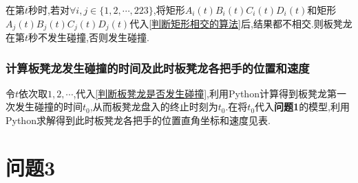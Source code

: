 \documentclass[lang=cn,newtx,10pt,scheme=chinese]{../Template/elegantbook}
\begin{document}
在第$t$秒时,若对$\forall i,j\in\{1,2,\cdots,223\}$,将矩形$A_i(t)B_i(t)C_i(t)D_i(t)$和矩形$A_j(t)B_j(t)C_j(t)D_j(t)$代入\eqref{判断矩形相交的算法}后,结果都不相交.则板凳龙在第$t$秒不发生碰撞,否则发生碰撞.

\subsection{计算板凳龙发生碰撞的时间及此时板凳龙各把手的位置和速度}

令$t$依次取$1,2,\cdots$,代入\eqref{判断板凳龙是否发生碰撞},利用Python计算得到板凳龙第一次发生碰撞的时间$t_0$,从而板凳龙盘入的终止时刻为$t_0$.在将$t_0$代入\textbf{问题1}的模型,利用Python求解得到此时板凳龙各把手的位置直角坐标和速度见表.



\chapter{问题3}
\end{document}
